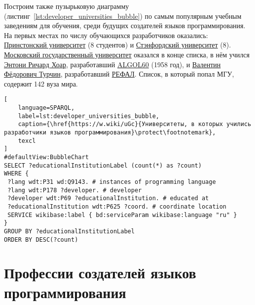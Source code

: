 Построим также пузырьковую диаграмму (листинг~\ref{lst:developer_universities_bubble}) по самым популярным учебным заведениям для обучения, среди будущих создателей языков программирования. На первых местах по числу обучающихся разработчиков оказались: \href{https://www.wikidata.org/wiki/Q21578}{Принстонский университет} (8 студентов) и \href{https://www.wikidata.org/wiki/Q41506}{Стэнфордский университет} (8). \href{https://ru.wikipedia.org/wiki/Московский_государственный_университет}{Московский государственный университет} оказался в конце списка, в нём учился \href{https://www.wikidata.org/wiki/Q92602}{Энтони Ричард Хоар}, разработавший \href{https://www.wikidata.org/wiki/Q188436}{ALGOL60} (1958 год), и \href{https://www.wikidata.org/wiki/Q4466506}{Валентин Фёдорович Турчин}, разработавший \href{https://www.wikidata.org/wiki/Q2626418}{РЕФАЛ}. Список, в который попал МГУ, содержит 142 вуза мира.

\begin{lstlisting}[
	language=SPARQL,
	label=lst:developer_universities_bubble,
	caption={\href{https://w.wiki/uGc}{Университеты, в которых учились разработчики языков программирования}\protect\footnotemark},
	texcl
]
#defaultView:BubbleChart
SELECT ?educationalInstitutionLabel (count(*) as ?count)
WHERE {
 ?lang wdt:P31 wd:Q9143. # instances of programming language
 ?lang wdt:P178 ?developer. # developer
 ?developer wdt:P69 ?educationalInstitution. # educated at
 ?educationalInstitution wdt:P625 ?coord. # coordinate location
 SERVICE wikibase:label { bd:serviceParam wikibase:language "ru" } 	
}
GROUP BY ?educationalInstitutionLabel
ORDER BY DESC(?count)
\end{lstlisting}

\section{Профессии создателей языков программирования}

